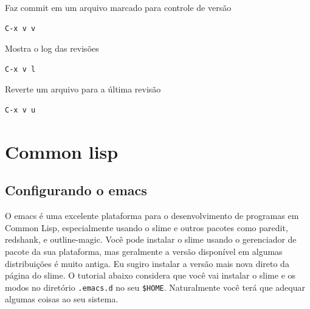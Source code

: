 \documentclass[12pt,brazil]{book}
\begin{document}
Faz commit em um arquivo marcado para controle de versão
\begin{verbatim}                                                                                                 
C-x v v                                                                                                          
\end{verbatim}

Mostra o log das revisões
\begin{verbatim}                                                                                                
C-x v l                                                                                                       
\end{verbatim}

Reverte um arquivo para a última revisão                                             
\begin{verbatim}                                                                                                 
C-x v u                                                                                                          
\end{verbatim}

\chapter{Common lisp}
\label{cha:common-lisp}

\section{Configurando o emacs}
\label{sec:configurando-o-emacs}

O emacs é uma excelente plataforma para o desenvolvimento de programas
em Common Lisp, especialmente usando o slime e outros pacotes como
paredit, redshank, e outline-magic. Você pode instalar o slime usando
o gerenciador de pacote da sua plataforma, mas geralmente a versão
disponível em algumas distribuições é muito antiga. Eu sugiro instalar
a versão mais nova direto da página do slime. O tutorial abaixo
considera que você vai instalar o slime e os modos no diretório
\texttt{.emacs.d} no seu \texttt{\$HOME}. Naturalmente você terá que
adequar algumas coisas ao seu sistema.
\end{document}
